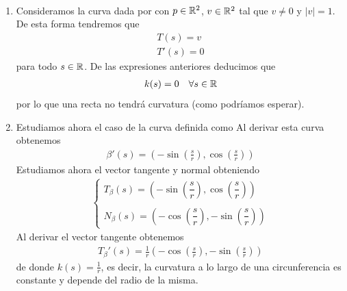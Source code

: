 \begin{ejemplo}\
    \begin{enumerate}
        \item Consideramos la curva dada por 
        con $p\in \mathbb{R}^2$, $v\in \mathbb{R}^2$ tal que $v\neq 0$ y $|v| = 1$. De esta forma tendremos que 
        \begin{gather*}
            T(s) = v\\
            T'(s) = 0
        \end{gather*}
        para todo $s\in \mathbb{R}$. De las expresiones anteriores deducimos que 
        \begin{gather*}
            k(s) = 0\ \ \ \forall s \in \mathbb{R}
        \end{gather*}
        por lo que una recta no tendrá curvatura (como podríamos esperar).

        \item Estudiamos ahora el caso de la curva definida como
        Al derivar esta curva obtenemos 
        \begin{gather*}
            \beta'(s) = \left(-\sin\left(\frac{s}{r}\right), \cos\left(\frac{s}{r}\right)\right)
        \end{gather*}
        Estudiamos ahora el vector tangente y normal obteniendo
        \begin{gather*}
            \left\{
                \begin{array}{c}
                    T_\beta(s) = \left(-\sin\left(\dfrac{s}{r}\right), \cos\left(\dfrac{s}{r}\right)\right)\\\\
                    N_\beta(s) =  \left(-\cos\left(\dfrac{s}{r}\right), -\sin\left(\dfrac{s}{r}\right)\right)
                \end{array}
            \right.
        \end{gather*}
        Al derivar el vector tangente obtenemos 
        \begin{gather*}
            T_\beta'(s) = \frac{1}{r}\left(-\cos\left(\frac{s}{r}\right), -\sin\left(\frac{s}{r}\right)\right)
        \end{gather*}
        de donde $k(s) = \frac{1}{r}$, es decir, la curvatura a lo largo de una circunferencia es constante y depende del radio de la misma.
    \end{enumerate}
\end{ejemplo}

